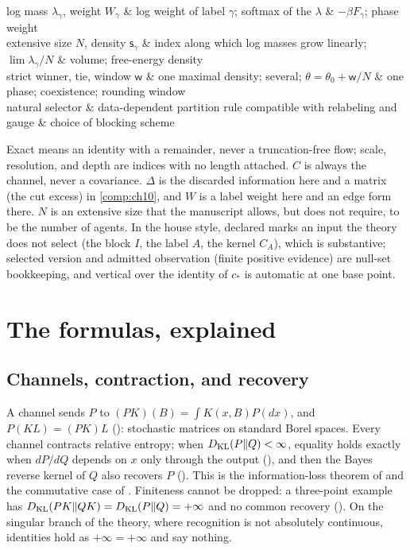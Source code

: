 \begin{decoder}
log mass $\lambda_\gamma$, weight $W_\gamma$ & log weight of label $\gamma$; softmax of the $\lambda$ & $-\beta F_\gamma$; phase weight\\
extensive size $N$, density $\mathsf s_\gamma$ & index along which log masses grow linearly; $\lim\lambda_\gamma/N$ & volume; free-energy density\\
strict winner, tie, window $\mathsf w$ & one maximal density; several; $\theta=\theta_0+\mathsf w/N$ & one phase; coexistence; rounding window\\
natural selector & data-dependent partition rule compatible with relabeling and gauge & choice of blocking scheme\\
\end{decoder}

Exact means an identity with a remainder, never a truncation-free flow; scale, resolution, and depth
are indices with no length attached. $C$ is always the channel, never a covariance. $\Delta$ is the
discarded information here and a matrix (the cut excess) in \cref{comp:ch10}, and $W$ is a label weight
here and an edge form there. $N$ is an extensive size that the manuscript allows, but does not require,
to be the number of agents. In the house style, declared marks an input the theory does not select (the
block $I$, the label $A$, the kernel $C_A$), which is substantive; selected version and admitted
observation (finite positive evidence) are null-set bookkeeping, and vertical over the identity of
$c_*$ is automatic at one base point.

\section{The formulas, explained}
\label{comp:ch09-formulas}

\subsection{Channels, contraction, and recovery}

A channel sends $P$ to $(PK)(B)=\int K(x,B)P(dx)$, and $P(KL)=(PK)L$ ():
stochastic matrices on standard Borel spaces. Every channel contracts relative entropy; when
$D_{\mathrm{KL}}(P\Vert Q)<\infty$, equality holds exactly when $dP/dQ$ depends on $x$ only through the output
(), and then the Bayes reverse kernel of $Q$ also recovers $P$
(). This is the information-loss theorem of
\citet{Kullback1951,Csiszar1967} and the commutative case of \citet{Petz1988}. Finiteness cannot be
dropped: a three-point example has $D_{\mathrm{KL}}(PK\Vert QK)=D_{\mathrm{KL}}(P\Vert Q)=+\infty$ and no common recovery
(). On the singular branch of the theory, where recognition is
not absolutely continuous, identities hold as $+\infty=+\infty$ and say nothing.

